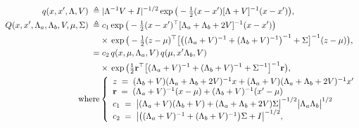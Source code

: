 \documentclass{article}
\begin{document}
\begin{equation}
\begin{split}
q(x,x',\Lambda,V)\;\triangleq&\;|\Lambda^{-1}V+I|^{-1/2}\exp\big(-\tfrac{1}{2}(x-x')[\Lambda+V]^{-1}(x-x')\big),\\
Q(x,x',\Lambda_a,\Lambda_b,V, \mu, \Sigma)\;\triangleq&\;
c_1\exp\big(-\tfrac{1}{2}(x-x')^\top[\Lambda_a+\Lambda_b+2V]^{-1}(x-x')\big)\\
&\times\,\exp\big(-\tfrac{1}{2}(z-\mu)^\top\big[\big((\Lambda_a+V)^{-1}+(\Lambda_b+V)^{-1}\big)^{-1}+\Sigma\big]^{-1}(z-\mu)\big),\\
=&\;c_2\,q(x,\mu,\Lambda_a,V)\,q(\mu,x'\Lambda_b,V)\\
&\times\,\exp\big(\tfrac{1}{2}{\bf
  r}^\top\big[(\Lambda_a+V)^{-1}+(\Lambda_b+V)^{-1}+\Sigma^{-1}\big]^{-1}{\bf r}\big),\\
\text{where}&\left\{\begin{array}{l}
z\;=\;(\Lambda_b+V)(\Lambda_a+\Lambda_b+2V)^{-1}x+(\Lambda_a+V)(\Lambda_a+\Lambda_b+2V)^{-1}x'\\
{\bf r}\;=\;(\Lambda_a+V)^{-1}(x-\mu)+(\Lambda_b+V)^{-1}(x'-\mu)\\
c_1\;=\;\big|(\Lambda_a+V)(\Lambda_b+V)+(\Lambda_a+\Lambda_b+2V)\Sigma\big|^{-1/2}\big|\Lambda_a\Lambda_b\big|^{1/2}\;\\
c_2\;=\;\big|\big((\Lambda_a+V)^{-1}+(\Lambda_b+V)^{-1}\big)\Sigma+I\big|^{-1/2},\end{array}\right.
\end{split}
\end{equation}
\end{document}
